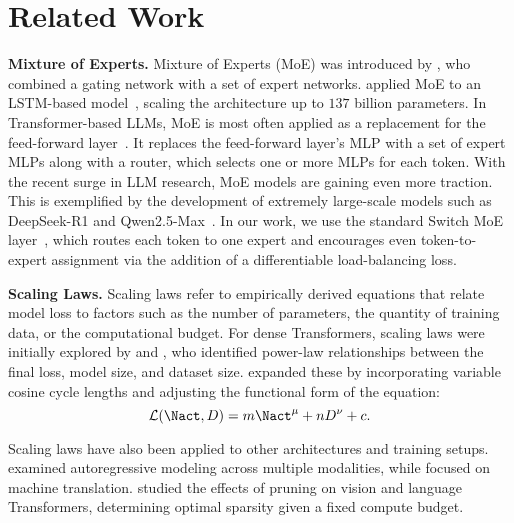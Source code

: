\section{Related Work}
\textbf{Mixture of Experts.}
Mixture of Experts (MoE) was introduced by \citet{moe1991}, who combined a gating network with a set of expert networks. \citet{shazeer2017outrageously} applied MoE to an LSTM-based model~\citep{hochreiter1997long}, scaling the architecture up to $137$ billion parameters. In Transformer-based LLMs, MoE is most often applied as a replacement for the feed-forward layer~\citep{lepikhin2020gshard, shazeer2018meshtensorflow}. It replaces the feed-forward layer's MLP with a set of expert MLPs along with a router, which selects one or more MLPs for each token. With the recent surge in LLM research, MoE models are gaining even more traction. This is exemplified by the development of extremely large-scale models such as DeepSeek-R1 and Qwen2.5-Max~\citep{deepseekr1, qwen25}.
In our work, we use the standard Switch MoE layer~\citep{fedus2022switch}, which routes each token to one expert and encourages even token-to-expert assignment via the addition of a differentiable load-balancing loss.

\newpage
\textbf{Scaling Laws.}  
Scaling laws refer to empirically derived equations that relate model loss
to factors such as the number of parameters, the quantity of training data, or the computational budget. For dense Transformers, scaling laws were initially explored by \citet{hestness2017deep} and \citet{kaplan2020scaling}, who identified power-law relationships between the final loss, model size, and dataset size. \citet{hoffmann2022training} expanded these by incorporating variable cosine cycle lengths and adjusting the functional form of the equation:
\vspace{-0.1cm}
\begin{equation} \label{eq:scaling_law_chinchilla}
  \mathcal{L}(\Nact, D) = m\Nact^{\mu} + nD^{\nu} + c.
\end{equation}



Scaling laws have also been applied to other architectures and training setups. \citet{henighan2020scaling} examined autoregressive modeling across multiple modalities, while \citet{ghorbani2021scaling} focused on machine translation. \citet{frantar2023scaling} studied the effects of pruning on vision and language Transformers, determining optimal sparsity given a fixed compute budget.

